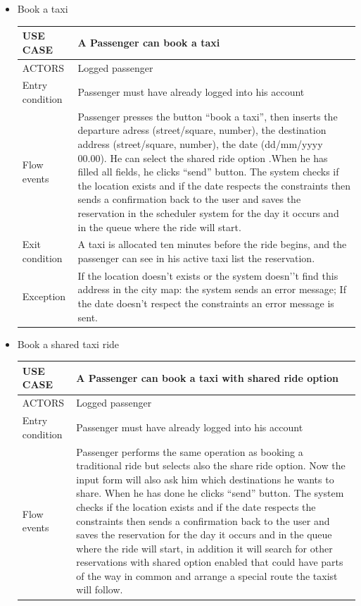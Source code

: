 \begin{itemize}
\item Book a taxi
	\begin{center}
   	 \begin{tabular}{ | l | p{11cm} |}
   	 \hline
   	USE CASE & A Passenger can book a taxi \\ \hline
   	 ACTORS & Logged passenger \\ \hline
    	 Entry condition & Passenger must have already logged into his account\\ \hline
    	 Flow events & Passenger presses the button “book a taxi”, then inserts the departure adress (street/square, number), the destination address (street/square, number), the date (dd/mm/yyyy 00.00). He can select the shared ride option .When he has filled all fields, he clicks “send” button. The system checks if the location exists and if the date respects the constraints then sends a confirmation back to the user and saves the reservation in the scheduler system for the day it occurs and in the queue where the ride will start.\\ \hline
  	   Exit condition & A taxi is allocated ten minutes before the ride begins, and the passenger can see in his active taxi list the reservation.\\ \hline
  	   Exception &  If the location doesn’t exists or the system doesn’’t find this address in the city map: the system sends an error message;
If the date doesn’t respect the constraints an error message is sent.\\ \hline
    \end{tabular}
\end{center}
\item Book a shared taxi ride
	\begin{center}
   	 \begin{tabular}{ | l | p{11cm} |}
   	 \hline
   	USE CASE & A Passenger can book a taxi with shared ride option\\ \hline
   	 ACTORS & Logged passenger \\ \hline
    	 Entry condition & Passenger must have already logged into his account \\ \hline
    	 Flow events & Passenger performs the same operation as booking a traditional ride but selects also the share ride option. Now the input form will also ask him which destinations he wants to share. When he has done he clicks “send” button. The system checks if the location exists and if the date respects the constraints then sends a confirmation back to the user and saves the reservation for the day it occurs and in the queue where the ride will start, in addition it will search for other reservations with shared option enabled that could have parts of the way in common and arrange a special route the taxist will follow.\\ \hline

\end{tabular}
\end{center}
\end{itemize}
